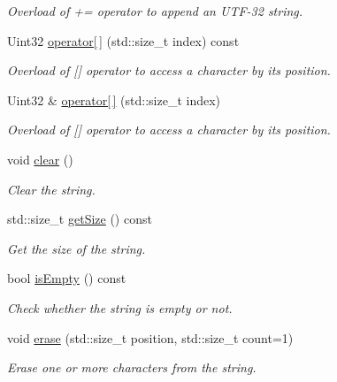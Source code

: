 \begin{DoxyCompactItemize}
\begin{DoxyCompactList}\small\item\em Overload of += operator to append an U\+T\+F-\/32 string. \end{DoxyCompactList}\item 
Uint32 \hyperlink{classsf_1_1_string_a035c1b585a0ebed81e773ecafed57926}{operator\mbox{[}$\,$\mbox{]}} (std\+::size\+\_\+t index) const
\begin{DoxyCompactList}\small\item\em Overload of \mbox{[}\mbox{]} operator to access a character by its position. \end{DoxyCompactList}\item 
Uint32 \& \hyperlink{classsf_1_1_string_abc989da7f4fb873ab29188d40772ab24}{operator\mbox{[}$\,$\mbox{]}} (std\+::size\+\_\+t index)
\begin{DoxyCompactList}\small\item\em Overload of \mbox{[}\mbox{]} operator to access a character by its position. \end{DoxyCompactList}\item 
void \hyperlink{classsf_1_1_string_a391c1b4950cbf3d3f8040cea73af2969}{clear} ()
\begin{DoxyCompactList}\small\item\em Clear the string. \end{DoxyCompactList}\item 
std\+::size\+\_\+t \hyperlink{classsf_1_1_string_ae7aff54e178f5d3e399953adff5cad20}{get\+Size} () const
\begin{DoxyCompactList}\small\item\em Get the size of the string. \end{DoxyCompactList}\item 
bool \hyperlink{classsf_1_1_string_a2ba26cb6945d2bbb210b822f222aa7f6}{is\+Empty} () const
\begin{DoxyCompactList}\small\item\em Check whether the string is empty or not. \end{DoxyCompactList}\item 
void \hyperlink{classsf_1_1_string_aaa78a0a46b3fbe200a4ccdedc326eb93}{erase} (std\+::size\+\_\+t position, std\+::size\+\_\+t count=1)
\begin{DoxyCompactList}\small\item\em Erase one or more characters from the string. \end{DoxyCompactList}\item 

\end{DoxyCompactItemize}
